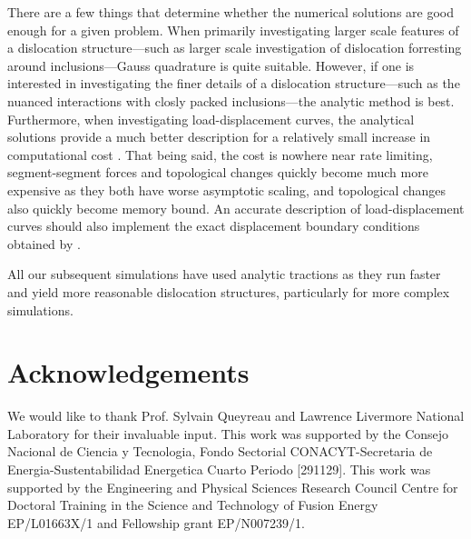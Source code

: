 \documentclass[11pt]{iopart}
\begin{document}
There are a few things that determine whether the numerical solutions are good enough for a given problem. When primarily investigating larger scale features of a dislocation structure---such as larger scale investigation of dislocation forresting around inclusions---Gauss quadrature is quite suitable. However, if one is interested in investigating the finer details of a dislocation structure---such as the nuanced interactions with closly packed inclusions---the analytic method is best. Furthermore, when investigating load-displacement curves, the analytical solutions provide a much better description for a relatively small increase in computational cost \cite{Queyreau}. That being said, the cost is nowhere near rate limiting, segment-segment forces and topological changes quickly become much more expensive as they both have worse asymptotic scaling, and topological changes also quickly become memory bound. An accurate description of load-displacement curves should also implement the exact displacement boundary conditions obtained by \citet{ddd_disp}.

All our subsequent simulations have used analytic tractions as they run faster and yield more reasonable dislocation structures, particularly for more complex simulations.

\section{Acknowledgements}

We would like to thank Prof. Sylvain Queyreau and Lawrence Livermore National Laboratory for their invaluable input. This work was supported by the Consejo Nacional de Ciencia y Tecnologia, Fondo Sectorial CONACYT-Secretaria de Energia-Sustentabilidad Energetica Cuarto Periodo [291129]. This work was supported by the Engineering and Physical Sciences Research Council Centre for Doctoral Training in the Science and Technology of Fusion Energy EP/L01663X/1 and Fellowship grant EP/N007239/1.

\newcommand{\newblock}{}








\end{document}
